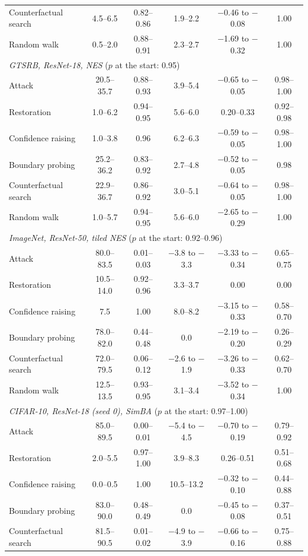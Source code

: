 \begin{footnotesize}
\begin{longtable}{@{\extracolsep{\fill}}lccccc@{}}
\quad Counterfactual search & 4.5--6.5 & 0.82--0.86 & 1.9--2.2 & $-$0.46 to $-$0.08 & 1.00 \\
\quad Random walk & 0.5--2.0 & 0.88--0.91 & 2.3--2.7 & $-$1.69 to $-$0.32 & 1.00 \\
\multicolumn{6}{l}{\emph{GTSRB, ResNet-18, NES} ($p$ at the start: 0.95)} \\
\quad Attack & 20.5--35.7 & 0.88--0.93 & 3.9--5.4 & $-$0.65 to $-$0.05 & 0.98--1.00 \\
\quad Restoration & 1.0--6.2 & 0.94--0.95 & 5.6--6.0 & 0.20--0.33 & 0.92--0.98 \\
\quad Confidence raising & 1.0--3.8 & 0.96 & 6.2--6.3 & $-$0.59 to $-$0.05 & 0.98--1.00 \\
\quad Boundary probing & 25.2--36.2 & 0.83--0.92 & 2.7--4.8 & $-$0.52 to $-$0.05 & 0.98 \\
\quad Counterfactual search & 22.9--36.7 & 0.86--0.92 & 3.0--5.1 & $-$0.64 to $-$0.05 & 0.98--1.00 \\
\quad Random walk & 1.0--5.7 & 0.94--0.95 & 5.6--6.0 & $-$2.65 to $-$0.29 & 1.00 \\
\multicolumn{6}{l}{\emph{ImageNet, ResNet-50, tiled NES} ($p$ at the start: 0.92--0.96)} \\
\quad Attack & 80.0--83.5 & 0.01--0.03 & $-$3.8 to $-$3.3 & $-$3.33 to $-$0.34 & 0.65--0.75 \\
\quad Restoration & 10.5--14.0 & 0.92--0.96 & 3.3--3.7 & 0.00 & 0.00 \\
\quad Confidence raising & 7.5 & 1.00 & 8.0--8.2 & $-$3.15 to $-$0.33 & 0.58--0.70 \\
\quad Boundary probing & 78.0--82.0 & 0.44--0.48 & 0.0 & $-$2.19 to $-$0.20 & 0.26--0.29 \\
\quad Counterfactual search & 72.0--79.5 & 0.06--0.12 & $-$2.6 to $-$1.9 & $-$3.26 to $-$0.33 & 0.62--0.70 \\
\quad Random walk & 12.5--13.5 & 0.93--0.95 & 3.1--3.4 & $-$3.52 to $-$0.34 & 1.00 \\
\multicolumn{6}{l}{\emph{CIFAR-10, ResNet-18 (seed 0), SimBA} ($p$ at the start: 0.97--1.00)} \\
\quad Attack & 85.0--89.5 & 0.00--0.01 & $-$5.4 to $-$4.5 & $-$0.70 to $-$0.19 & 0.79--0.92 \\
\quad Restoration & 2.0--5.5 & 0.97--1.00 & 3.9--8.3 & 0.26--0.51 & 0.51--0.68 \\
\quad Confidence raising & 0.0--0.5 & 1.00 & 10.5--13.2 & $-$0.32 to $-$0.10 & 0.44--0.88 \\
\quad Boundary probing & 83.0--90.0 & 0.48--0.49 & 0.0 & $-$0.45 to $-$0.08 & 0.37--0.51 \\
\quad Counterfactual search & 81.5--90.5 & 0.01--0.02 & $-$4.9 to $-$3.9 & $-$0.66 to $-$0.16 & 0.75--0.88 \\
\bottomrule
\end{longtable}
\end{footnotesize}
